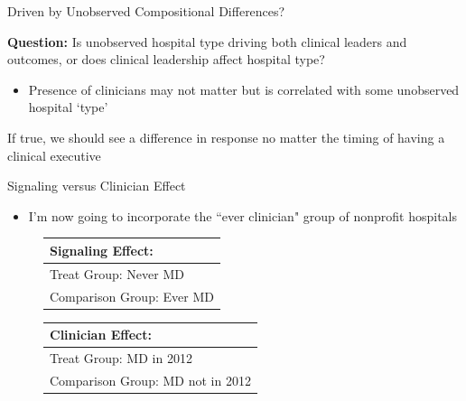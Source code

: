 \documentclass[notes,11pt, aspectratio=169]{beamer}
\newenvironment{wideitemize}{\itemize\addtolength{\itemsep}{10pt}}{\enditemize}
\begin{document}
\begin{frame}{Driven by Unobserved Compositional Differences?}
\large

\textbf{Question:} Is unobserved hospital type driving both clinical leaders and outcomes, or does clinical leadership affect hospital type?
\vspace{3mm}

\begin{itemize}
    \item Presence of clinicians may not matter but is correlated with some unobserved hospital `type'
\end{itemize}

\vspace{3mm}
\begin{wideitemize}
    \item If true, we should see a difference in response no matter the timing of having a clinical executive
\end{wideitemize}
\end{frame}

\begin{frame}{Signaling versus Clinician Effect}
\begin{itemize}
    \item I'm now going to incorporate the ``ever clinician" group of nonprofit hospitals
\end{itemize}

\vspace{5mm}
\large
    \begin{figure}[ht!]
\begin{center}
 
 \begin{tabular}{| m{15em} |}
 \hline \vspace{1mm}
 \textbf{Signaling Effect:}\\ [0.5ex]
 \hline\hline 
 \vspace{2mm}
 Treat Group:  \hspace{15mm} Never MD \\
 \vspace{2mm}
 Comparison Group: \hspace{3mm} Ever MD  \\
 [1ex]
 \hline
 \end{tabular}
\hfil   %
 \begin{tabular}{|m{18em}|}
 \hline \vspace{1mm}
 \textbf{Clinician Effect:}\\ [0.5ex]
 \hline\hline
 \vspace{2mm}
 Treat Group: \hspace{11mm} MD in 2012 \\
 \vspace{2mm}
 Comparison Group:  MD not in 2012  \\
 [1ex]
 \hline
 \end{tabular}
 
\end{center}
 \end{figure}

\end{frame}
\end{document}
